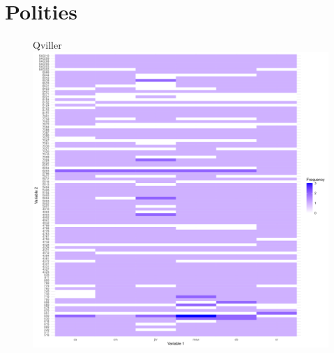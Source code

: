 \documentclass{beamer}
\begin{document}
\section{Polities} \label{Polities}

\begin{frame}{}

	\begin{figure}[htpb]{Qviller}
		\centering
		\includegraphics[width=\linewidth]{img/MicrosoftTeams-image (2).png}
		\label{Qviller}
	\end{figure}

\end{frame}
\end{document}
